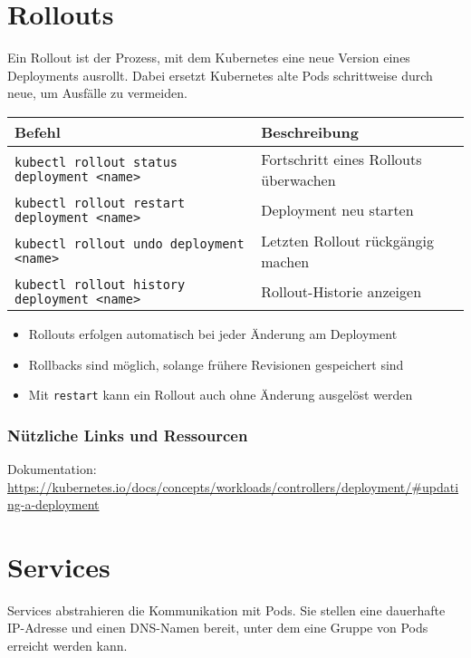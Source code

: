 \section{Rollouts}
Ein Rollout ist der Prozess, mit dem Kubernetes eine neue Version eines Deployments ausrollt. Dabei ersetzt Kubernetes alte Pods schrittweise durch neue, um Ausfälle zu vermeiden. \\

\noindent
\begin{tabular}{|p{}|p{}|}
\hline
\textbf{Befehl} & \textbf{Beschreibung} \\
\hline
\texttt{kubectl rollout status deployment <name>} & Fortschritt eines Rollouts überwachen \\
\texttt{kubectl rollout restart deployment <name>} & Deployment neu starten\\
\texttt{kubectl rollout undo deployment <name>} & Letzten Rollout rückgängig machen \\
\texttt{kubectl rollout history deployment <name>} & Rollout-Historie anzeigen \\
\hline
\end{tabular}

\begin{itemize}
    \item Rollouts erfolgen automatisch bei jeder Änderung am Deployment
    \item Rollbacks sind möglich, solange frühere Revisionen gespeichert sind
    \item Mit \texttt{restart} kann ein Rollout auch ohne Änderung ausgelöst werden
\end{itemize}
\subsubsection{Nützliche Links und Ressourcen}
Dokumentation:\\
\url{https://kubernetes.io/docs/concepts/workloads/controllers/deployment/#updating-a-deployment}




\section{Services}
\label{sec:services}
Services abstrahieren die Kommunikation mit Pods. Sie stellen eine dauerhafte IP-Adresse und einen DNS-Namen bereit, unter dem eine Gruppe von Pods erreicht werden kann. \\

